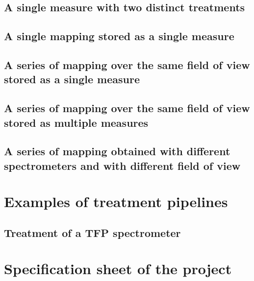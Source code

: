 \documentclass{book}
\begin{document}
    \section{A single measure with two distinct treatments}
        

    \section{A single mapping stored as a single measure}
        
    
    \section{A series of mapping over the same field of view stored as a single measure}
        
    
    \section{A series of mapping over the same field of view stored as multiple measures}
        
    
    \section{A series of mapping obtained with different spectrometers and with different field of view}
        

\chapter{Examples of treatment pipelines}
    \section{Treatment of a TFP spectrometer} \label{subsec:example_treatment.TFP}
        
        

\chapter{Specification sheet of the project}
    
\end{document}

